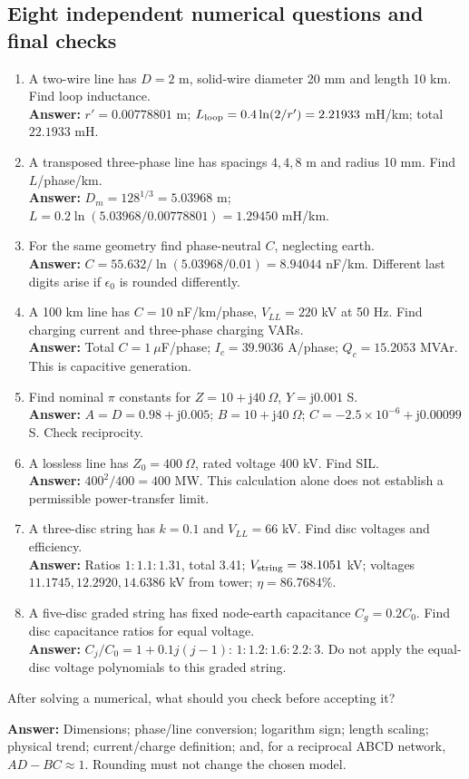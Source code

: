 \documentclass[11pt,a4paper]{article}
\newcommand{\checkq}[2]{\begin{tcolorbox}[breakable=false,colback=pale,colframe=teal,coltitle=white,title={Check your understanding}]#1\par\textbf{Answer:} #2\end{tcolorbox}}
\newcommand{\jj}{\mathrm j}
\begin{document}
\subsection{Eight independent numerical questions and final checks}
\begin{enumerate}
\item A two-wire line has $D=2$ m, solid-wire diameter 20 mm and length 10 km. Find loop inductance.\\
\textbf{Answer:} $r'=0.00778801$ m; $L_{\rm loop}=0.4\ln(2/r')=2.21933$ mH/km; total $22.1933$ mH.
\item A transposed three-phase line has spacings $4,4,8$ m and radius 10 mm. Find $L$/phase/km.\\
\textbf{Answer:} $D_m=128^{1/3}=5.03968$ m; $L=0.2\ln(5.03968/0.00778801)=1.29450$ mH/km.
\item For the same geometry find phase-neutral $C$, neglecting earth.\\
\textbf{Answer:} $C=55.632/\ln(5.03968/0.01)=8.94044$ nF/km. Different last digits arise if $\epsilon_0$ is rounded differently.
\item A 100 km line has $C=10$ nF/km/phase, $V_{LL}=220$ kV at 50 Hz. Find charging current and three-phase charging VARs.\\
\textbf{Answer:} Total $C=1\ \mu$F/phase; $I_c=39.9036$ A/phase; $Q_c=15.2053$ MVAr. This is capacitive generation.
\item Find nominal $\pi$ constants for $Z=10+\jj40\ \Omega$, $Y=\jj0.001$ S.\\
\textbf{Answer:} $A=D=0.98+\jj0.005$; $B=10+\jj40\ \Omega$; $C=-2.5\times10^{-6}+\jj0.00099$ S. Check reciprocity.
\item A lossless line has $Z_0=400\ \Omega$, rated voltage 400 kV. Find SIL.\\
\textbf{Answer:} $400^2/400=400$ MW. This calculation alone does not establish a permissible power-transfer limit.
\item A three-disc string has $k=0.1$ and $V_{LL}=66$ kV. Find disc voltages and efficiency.\\
\textbf{Answer:} Ratios $1:1.1:1.31$, total 3.41; $V_{\rm string}=38.1051$ kV; voltages $11.1745,12.2920,14.6386$ kV from tower; $\eta=86.7684\%$.
\item A five-disc graded string has fixed node-earth capacitance $C_g=0.2C_0$. Find disc capacitance ratios for equal voltage.\\
\textbf{Answer:} $C_j/C_0=1+0.1j(j-1)$: $1:1.2:1.6:2.2:3$. Do not apply the equal-disc voltage polynomials to this graded string.
\end{enumerate}
\checkq{After solving a numerical, what should you check before accepting it?}{Dimensions; phase/line conversion; logarithm sign; length scaling; physical trend; current/charge definition; and, for a reciprocal ABCD network, $AD-BC\approx1$. Rounding must not change the chosen model.}
\end{document}
